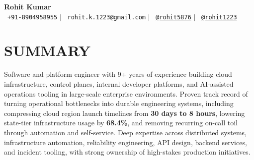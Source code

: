 \documentclass[letterpaper,11pt]{article}
\begin{document}
\begin{center}
    \textbf{\Huge Rohit Kumar} \\ \vspace{5pt}
    \small \faPhone*\ \texttt{+91-8904958955} \hspace{1pt} $|$
    \hspace{1pt} \faEnvelope\ \texttt{rohit.k.1223@gmail.com} \hspace{1pt} $|$
    \hspace{1pt} \faLinkedin\ \href{https://www.linkedin.com/in/rohit5876}{\texttt{@rohit5876}} \hspace{1pt} $|$
    \hspace{1pt} \faGithub\ \href{https://github.com/rohit1223}{\texttt{@rohit1223}} \hspace{1pt} \\ \vspace{-3pt}
\end{center}

\section{SUMMARY}
\begin{itemize}[leftmargin=0in, label={}]
    \small{\item{Software and platform engineer with 9+ years of experience building cloud infrastructure, control planes, internal developer platforms, and AI-assisted operations tooling in large-scale enterprise environments. Proven track record of turning operational bottlenecks into durable engineering systems, including compressing cloud region launch timelines from \textbf{30 days to 8 hours}, lowering state-tier infrastructure usage by \textbf{68.4\%}, and removing recurring on-call toil through automation and self-service. Deep expertise across distributed systems, infrastructure automation, reliability engineering, API design, backend services, and incident tooling, with strong ownership of high-stakes production initiatives.}}
\end{itemize}

\end{document}
